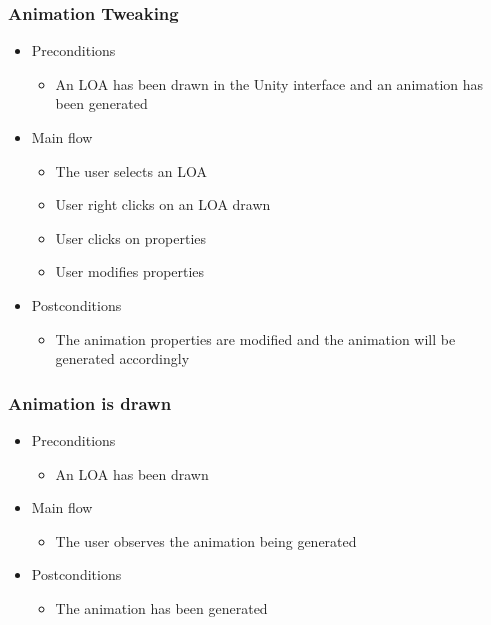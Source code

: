 \subsubsection{Animation Tweaking}
    \begin{itemize}
    \item Preconditions
        \begin{itemize}
            \item An LOA has been drawn in the Unity interface and an animation has been generated
        \end{itemize}
    \end{itemize}
    \begin{itemize}
        \item Main flow
        \begin{itemize}
            \item The user selects an LOA
            \item User right clicks on an LOA drawn
            \item User clicks on properties
            \item User modifies properties
        \end{itemize}
    \end{itemize}
    \begin{itemize}
        \item Postconditions
        \begin{itemize}
            \item The animation properties are modified and the animation will be generated accordingly
        \end{itemize}
    \end{itemize}

\subsubsection{Animation is drawn}
    \begin{itemize}
    \item Preconditions
        \begin{itemize}
            \item An LOA has been drawn
        \end{itemize}
    \end{itemize}
    \begin{itemize}
        \item Main flow
        \begin{itemize}
            \item The user observes the animation being generated
        \end{itemize}
    \end{itemize}
    \begin{itemize}
        \item Postconditions
        \begin{itemize}
            \item The animation has been generated
        \end{itemize}
    \end{itemize}
